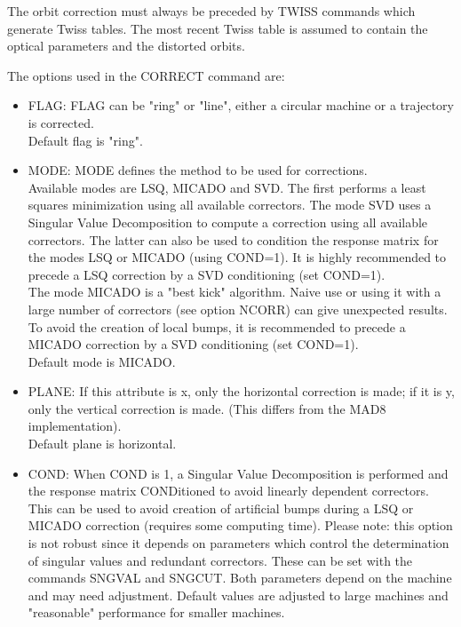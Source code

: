 The orbit correction must always be preceded by TWISS commands  which
generate Twiss tables. The most recent Twiss table is assumed to contain
the optical parameters and the distorted orbits. 

The options used in the CORRECT command are: 

\begin{itemize}
   \item FLAG: FLAG can be "ring" or "line", either a circular machine
     or a trajectory is corrected.   
     \\ Default flag is "ring". 

   \item MODE: MODE defines the method to be used for corrections. 
     \\ Available modes are LSQ, MICADO and SVD.  The first performs a
     least squares minimization using all available correctors. The mode
     SVD uses a Singular Value Decomposition to compute a correction
     using all available correctors. The latter can also be used to
     condition the response matrix for the modes LSQ or MICADO (using
     COND=1). It is highly recommended to precede a LSQ correction by a
     SVD conditioning (set COND=1).  
     \\ The mode MICADO is a "best kick" algorithm. Naive use or using
     it with a large number of correctors (see option NCORR) can give
     unexpected results. To avoid the creation of local bumps, it is
     recommended to precede a MICADO correction by a SVD conditioning
     (set COND=1).  
     \\ Default mode is MICADO.            

   \item PLANE: If this attribute is x, only the horizontal correction
     is made; if it is y, only the vertical correction is made. (This
     differs from the MAD8 implementation).  
     \\ Default plane is horizontal. 

   \item COND: When COND is 1, a Singular Value Decomposition is
     performed and  the response matrix CONDitioned to avoid linearly
     dependent correctors. This can be used to avoid creation of
     artificial bumps during a LSQ or MICADO correction (requires some
     computing time).  Please note: this option is not robust since it
     depends on parameters which control the determination of singular
     values and redundant correctors. These can be set with the commands
     SNGVAL and SNGCUT. Both parameters depend on the machine and may
     need adjustment. Default values are adjusted to large machines and
     "reasonable" performance for smaller machines.  
     \\


\end{itemize}
